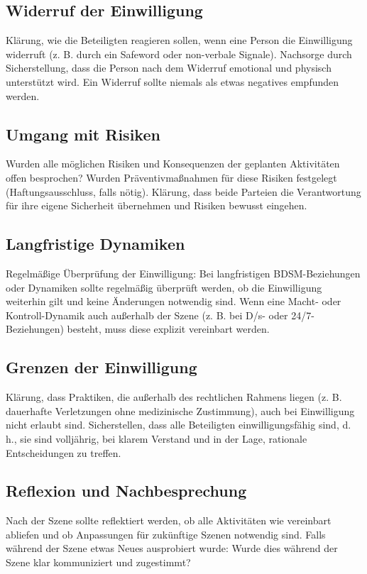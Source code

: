 \documentclass[a4paper,12pt]{article}
\begin{document}
\subsection{Widerruf der Einwilligung}
Klärung, wie die Beteiligten reagieren sollen, wenn eine Person die Einwilligung widerruft (z. B. durch ein Safeword oder non-verbale Signale). Nachsorge durch Sicherstellung, dass die Person nach dem Widerruf emotional und physisch unterstützt wird. Ein Widerruf sollte niemals als etwas negatives empfunden werden.

\subsection{Umgang mit Risiken}
Wurden alle möglichen Risiken und Konsequenzen der geplanten Aktivitäten offen besprochen? Wurden Präventivmaßnahmen für diese Risiken festgelegt (Haftungsausschluss, falls nötig). Klärung, dass beide Parteien die Verantwortung für ihre eigene Sicherheit übernehmen und Risiken bewusst eingehen.

\subsection{Langfristige Dynamiken}
Regelmäßige Überprüfung der Einwilligung: Bei langfristigen BDSM-Beziehungen oder Dynamiken sollte regelmäßig überprüft werden, ob die Einwilligung weiterhin gilt und keine Änderungen notwendig sind. Wenn eine Macht- oder Kontroll-Dynamik auch außerhalb der Szene (z. B. bei D/s- oder 24/7-Beziehungen) besteht, muss diese explizit vereinbart werden.

\subsection{Grenzen der Einwilligung}
Klärung, dass Praktiken, die außerhalb des rechtlichen Rahmens liegen (z. B. dauerhafte Verletzungen ohne medizinische Zustimmung), auch bei Einwilligung nicht erlaubt sind. Sicherstellen, dass alle Beteiligten einwilligungsfähig sind, d. h., sie sind volljährig, bei klarem Verstand und in der Lage, rationale Entscheidungen zu treffen.

\subsection{Reflexion und Nachbesprechung}
Nach der Szene sollte reflektiert werden, ob alle Aktivitäten wie vereinbart abliefen und ob Anpassungen für zukünftige Szenen notwendig sind. Falls während der Szene etwas Neues ausprobiert wurde: Wurde dies während der Szene klar kommuniziert und zugestimmt?
\end{document}
